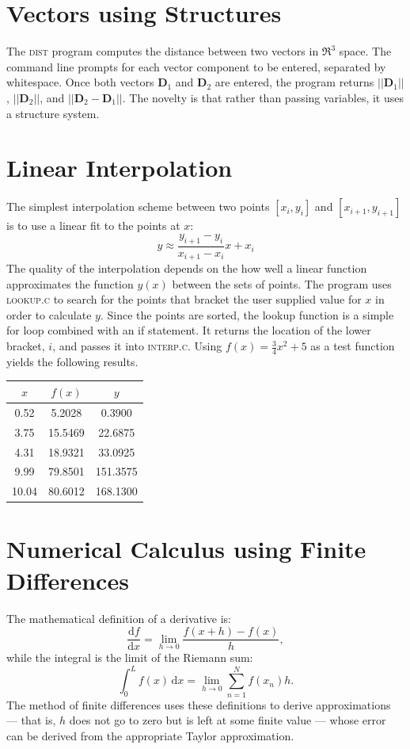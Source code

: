 \documentclass{scrartcl}
\begin{document}
\section{Vectors using Structures}
The \textsc{dist} program computes the distance between two vectors in $\Re^{3}$ space.
The command line prompts for each vector component to be entered, separated by whitespace.
Once both vectors \textbf{D}$_{1}$ and \textbf{D}$_{2}$ are entered, the program returns $||$\textbf{D}$_{1}||$, $||$\textbf{D}$_{2}||$, and $||$\textbf{D}$_{2}-$\textbf{D}$_{1}||$.
The novelty is that rather than passing variables, it uses a structure system.
\section{Linear Interpolation}
The simplest interpolation scheme between two points $[x_{i},y_{i}]$ and $[x_{i+1},y_{i+1}]$ is to use a linear fit to the points at $x$:
\begin{equation}
	y\approx\frac{y_{i+1}-y_{i}}{x_{i+1}-x_{i}}x+x_{i}
\end{equation}
The quality of the interpolation depends on the how well a linear function approximates the function $y(x)$ between the sets of points.
The program uses \textsc{lookup.c} to search for the points that bracket the user supplied value for $x$ in order to calculate $y$.
Since the points are sorted, the lookup function is a simple for loop combined with an if statement.
It returns the location of the lower bracket, $i$, and passes it into \textsc{interp.c}.
Using $f(x)=\frac{3}{4}x^{2}+5$ as a test function yields the following results.
\begin{center}
   \begin{tabular}{|c|c|c|}\hline
		$x$ & $f(x)$ & $y$ \\\hline
		 0.52 &  5.2028 &   0.3900 \\\hline
		 3.75 & 15.5469 &  22.6875 \\\hline
		 4.31 & 18.9321 &  33.0925 \\\hline
		 9.99 & 79.8501 & 151.3575 \\\hline
		10.04 & 80.6012 & 168.1300 \\\hline
	\end{tabular}
\end{center}
\section{Numerical Calculus using Finite Differences}
The mathematical definition of a derivative is:
\begin{equation}
	\frac{\textrm{d}f}{\textrm{d}x}=\lim_{h\rightarrow 0}{\frac{f(x+h)-f(x)}{h}},
\end{equation}
while the integral is the limit of the Riemann sum:
\begin{equation}
	\int_{0}^{L}{f(x)\,\textrm{d} x}=\lim_{h\rightarrow 0}{\sum_{n=1}^{N}{f(x_{n})h}}.
\end{equation}
The method of finite differences uses these definitions to derive approximations --- that is, $h$ does not go to zero but is left at some finite value --- whose error can be derived from the appropriate Taylor approximation.
\end{document}
